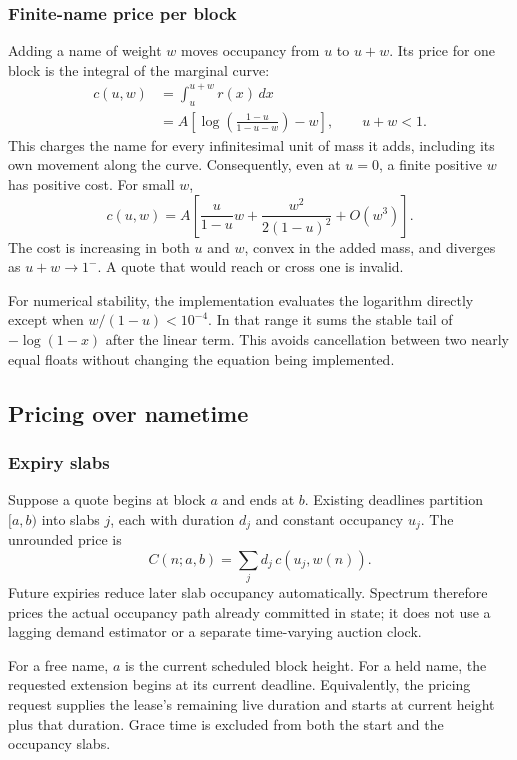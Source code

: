 \documentclass[10pt,twocolumn]{article}
\begin{document}
\subsubsection{Finite-name price per block}

Adding a name of weight $w$ moves occupancy from $u$ to $u+w$. Its price for
one block is the integral of the marginal curve:
\begin{align*}
  c(u,w)
    &=\int_u^{u+w}r(x)\,dx\\
    &=A\left[
      \log\left(\frac{1-u}{1-u-w}\right)-w
    \right],
  \qquad u+w<1.
\end{align*}
This charges the name for every infinitesimal unit of mass it adds, including
its own movement along the curve. Consequently, even at $u=0$, a finite
positive $w$ has positive cost. For small $w$,
\[
  c(u,w)=A\left[
    \frac{u}{1-u}w+
    \frac{w^2}{2(1-u)^2}+O(w^3)
  \right].
\]
The cost is increasing in both $u$ and $w$, convex in the added mass, and
diverges as $u+w\to1^-$. A quote that would reach or cross one is invalid.

For numerical stability, the implementation evaluates the logarithm directly
except when $w/(1-u)<10^{-4}$. In that range it sums the stable tail of
$-\log(1-x)$ after the linear term. This avoids cancellation between two
nearly equal floats without changing the equation being implemented.

\subsection{Pricing over nametime}

\subsubsection{Expiry slabs}

Suppose a quote begins at block $a$ and ends at $b$. Existing deadlines
partition $[a,b)$ into slabs $j$, each with duration $d_j$ and constant
occupancy $u_j$. The unrounded price is
\[
  C(n;a,b)=\sum_j d_j\,c(u_j,w(n)).
\]
Future expiries reduce later slab occupancy automatically. Spectrum therefore
prices the actual occupancy path already committed in state; it does not use a
lagging demand estimator or a separate time-varying auction clock.

For a free name, $a$ is the current scheduled block height. For a held name,
the requested extension begins at its current deadline. Equivalently, the
pricing request supplies the lease's remaining live duration and starts at
current height plus that duration. Grace time is excluded from both the start
and the occupancy slabs.
\end{document}
